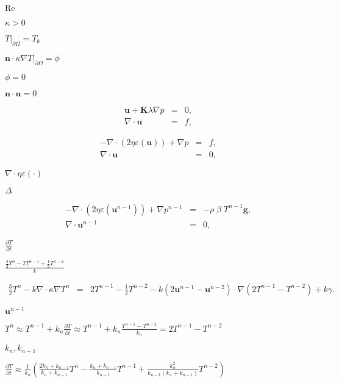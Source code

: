 \documentclass{article}
\begin{document}
$\mathrm{Re}$
\pagebreak

$\kappa>0$
\pagebreak

$T|_{\partial\Omega}=T_b$
\pagebreak

$\mathbf{n}\cdot\kappa\nabla T|_{\partial\Omega}=\phi$
\pagebreak

$\phi=0$
\pagebreak

$\mathbf n \cdot \mathbf u = 0$
\pagebreak

\begin{eqnarray*} \mathbf u + {\mathbf K}\lambda \nabla p &=& 0, \\ \nabla\cdot \mathbf u &=& f, \end{eqnarray*}
\pagebreak

\begin{eqnarray*} -\nabla \cdot (2 \eta \varepsilon ({\mathbf u})) + \nabla p &=& f, \\ \nabla\cdot \mathbf u &=& 0, \end{eqnarray*}
\pagebreak

$\nabla \cdot \eta \varepsilon (\cdot)$
\pagebreak

$\Delta$
\pagebreak

\begin{eqnarray*} -\nabla \cdot (2\eta \varepsilon ({\mathbf u}^{n-1})) + \nabla p^{n-1} &=& -\rho\; \beta \; T^{n-1} \mathbf{g}, \\ \nabla \cdot {\mathbf u}^{n-1} &=& 0, \end{eqnarray*}
\pagebreak

$\frac{\partial T}{\partial t}$
\pagebreak

$\frac{\frac 32 T^{n}-2T^{n-1}+\frac 12 T^{n-2}}{k}$
\pagebreak

\begin{eqnarray*} \frac 32 T^n - k\nabla \cdot \kappa \nabla T^n &=& 2 T^{n-1} - \frac 12 T^{n-2} - k(2{\mathbf u}^{n-1} - {\mathbf u}^{n-2} ) \cdot \nabla (2T^{n-1}-T^{n-2}) + k\gamma. \end{eqnarray*}
\pagebreak

${\mathbf u}^{n-1}$
\pagebreak

$T^n \approx T^{n-1} + k_n \frac{\partial T}{\partial t} \approx T^{n-1} + k_n \frac{T^{n-1}-T^{n-2}}{k_n} = 2T^{n-1}-T^{n-2}$
\pagebreak

$k_n,k_{n-1}$
\pagebreak

$\frac{\partial T}{\partial t} \approx \frac 1{k_n} \left( \frac{2k_n+k_{n-1}}{k_n+k_{n-1}} T^{n} - \frac{k_n+k_{n-1}}{k_{n-1}}T^{n-1} + \frac{k_n^2}{k_{n-1}(k_n+k_{n-1})} T^{n-2} \right)$
\pagebreak
\end{document}
